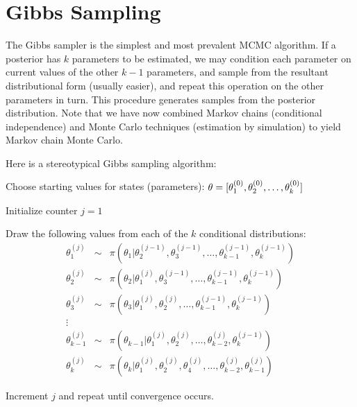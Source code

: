 
\hypertarget{gibbs-sampling}{}
\section*{Gibbs Sampling}

The Gibbs sampler is the simplest and most prevalent MCMC algorithm. If a posterior has $k$ parameters to be estimated, we may condition each parameter on current values of the other $k-1$ parameters, and sample from the resultant distributional form (usually easier), and repeat this operation on the other parameters in turn. This procedure generates samples from the posterior distribution. Note that we have now combined Markov chains (conditional independence) and Monte Carlo techniques (estimation by simulation) to yield Markov chain Monte Carlo.

Here is a stereotypical Gibbs sampling algorithm:

\begin{list}{}
{}
\item Choose starting values for states (parameters): ${\bf \theta} = [\theta_1^{(0)},\theta_2^{(0)},\ldots,\theta_k^{(0)}]$
\item Initialize counter $j=1$
\item Draw the following values from each of the $k$ conditional distributions:
\begin{eqnarray*}
\theta_1^{(j)} &\sim& \pi(\theta_1 | \theta_2^{(j-1)},\theta_3^{(j-1)},\ldots,\theta_{k-1}^{(j-1)},\theta_k^{(j-1)}) \\
\theta_2^{(j)} &\sim& \pi(\theta_2 | \theta_1^{(j)},\theta_3^{(j-1)},\ldots,\theta_{k-1}^{(j-1)},\theta_k^{(j-1)}) \\
\theta_3^{(j)} &\sim& \pi(\theta_3 | \theta_1^{(j)},\theta_2^{(j)},\ldots,\theta_{k-1}^{(j-1)},\theta_k^{(j-1)}) \\
\vdots \\
\theta_{k-1}^{(j)} &\sim& \pi(\theta_{k-1} | \theta_1^{(j)},\theta_2^{(j)},\ldots,\theta_{k-2}^{(j)},\theta_k^{(j-1)}) \\
\theta_k^{(j)} &\sim& \pi(\theta_k | \theta_1^{(j)},\theta_2^{(j)},\theta_4^{(j)},\ldots,\theta_{k-2}^{(j)},\theta_{k-1}^{(j)})
\end{eqnarray*}
\item Increment $j$ and repeat until convergence occurs.
\end{list}

